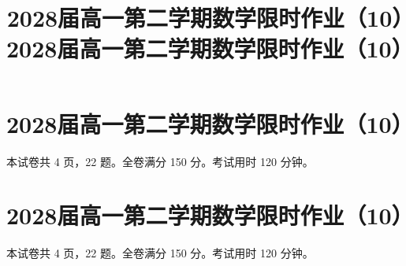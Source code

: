 \documentclass{../exam-zh}
\begin{document}
\tableofcontents

\chapter{2028届高一第二学期数学限时作业（10）}
\title{2028届高一第二学期数学限时作业（10）}

\secret
\maketitle

本试卷共 4 页，22 题。全卷满分 150 分。考试用时 120 分钟。







\chapter{2028届高一第二学期数学限时作业（10）}
\title{2028届高一第二学期数学限时作业（10）}
\setcounter{page}{1}

\secret
\maketitle

本试卷共 4 页，22 题。全卷满分 150 分。考试用时 120 分钟。




\end{document}
